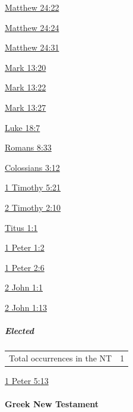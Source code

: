 				\begin{compactdesc}
					\item[{\hyperref[MATTHEW-24-22]{Matthew 24:22}}]
					\item[{\hyperref[MATTHEW-24-24]{Matthew 24:24}}]
					\item[{\hyperref[MATTHEW-24-31]{Matthew 24:31}}]
					\item[{\hyperref[MARK-13-20]{Mark 13:20}}]
					\item[{\hyperref[MARK-13-22]{Mark 13:22}}]
					\item[{\hyperref[MARK-13-27]{Mark 13:27}}]
					\item[{\hyperref[LUKE-18-7]{Luke 18:7}}]
					\item[{\hyperref[ROMANS-8-33]{Romans 8:33}}]
					\item[{\hyperref[COLOSSIANS-3-12]{Colossians 3:12}}]
					\item[{\hyperref[1TIMOTHY-5-21]{1 Timothy 5:21}}]
					\item[{\hyperref[2TIMOTHY-2-10]{2 Timothy 2:10}}]
					\item[{\hyperref[TITUS-1-1]{Titus 1:1}}]
					\item[{\hyperref[1PETER-1-2]{1 Peter 1:2}}]
					\item[{\hyperref[1PETER-2-6]{1 Peter 2:6}}]
					\item[{\hyperref[2JOHN-1-1]{2 John 1:1}}]
					\item[{\hyperref[2JOHN-1-13]{2 John 1:13}}]
				\end{compactdesc}
				
			\subparagraph{Elected}
	
				\begin{tabular}{ll}
					Total occurrences in the NT & 1
				\end{tabular}
				
				\begin{compactdesc}
					\item[{\hyperref[1PETER-5-13]{1 Peter 5:13}}]
				\end{compactdesc}
			
		\paragraph{Greek New Testament} %
			\label{ELECTION-GREEK}
			
			\subparagraph{\texorpdfstring{}{}}
				\label{EKLEKTOS}
			

